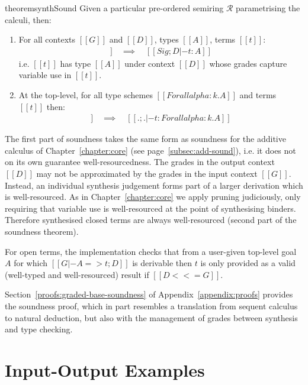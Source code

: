\begin{restatable}{theorem}{synthSound}
\label{lemma:synthSound}
Given a particular pre-ordered semiring $\mathcal{R}$ parametrising the calculi,
then:
\begin{enumerate}
\item For all contexts $[[ G ]]$ and $[[ D ]]$, types $[[ A ]]$, terms $[[ t ]]$:
\begin{align*}
[[ Sig; G |- A =>+ t ; D ]] \quad \implies \quad [[ Sig; D |- t : A ]]
\end{align*}
i.e. $[[ t ]]$ has type $[[ A ]]$
under context $[[ D ]]$ whose grades capture variable use in $[[ t ]]$.
\item At the top-level,
for all type schemes $[[ Forall alpha : k . A ]]$ and terms $[[ t ]]$ then:
%
\begin{align*}
[[ . ; . |- Forall alpha : k . A =>+ t ; . ]]
\quad \implies \quad [[  . ; . |- t : Forall alpha : k . A ]]
\end{align*}
%
\end{enumerate}
\end{restatable}
The first part of soundness takes the same form as soundness for the additive
calculus of Chapter~\ref{chapter:core} (see page~\ref{subsec:add-sound}), i.e.
it does not on its own guarantee well-resourcedness. The grades in the output
context $[[ D ]]$  may not be approximated by the grades in the input context
$[[ G ]]$. Instead, an individual synthesis judgement forms part of a larger
derivation which is well-resourced.
%
As in Chapter~\ref{chapter:core} we apply pruning judiciously, only requiring
that variable use is well-resourced at the point of synthesising binders.
Therefore synthesised closed terms are always well-resourced (second part of the
soundness theorem).

For open terms, the implementation checks that from a user-given top-level goal
$A$ for which $[[ G |- A => t ; D ]]$ is derivable then $t$ is only provided as
a valid (well-typed and well-resourced) result if $[[ D <<= G ]]$.

Section~\ref{proofs:graded-base-soundness} of Appendix~\ref{appendix:proofs}
provides the soundness proof, which in part resembles a translation from sequent
calculus to natural deduction, but also with the management of grades between
synthesis and type checking.

\section{Input-Output Examples}

